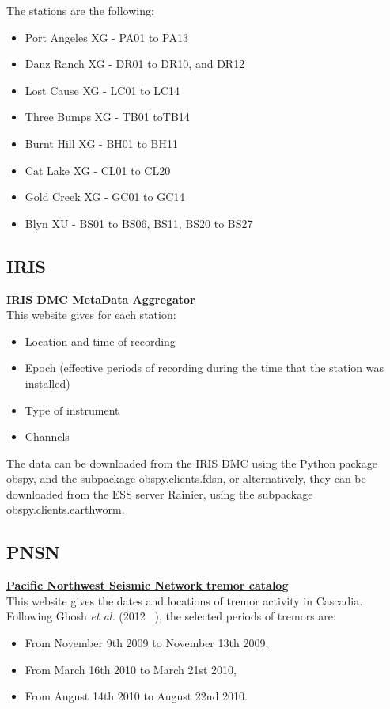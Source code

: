 \documentclass[main.tex]{subfiles}
\begin{document}
The stations are the following:
\begin{itemize}
	\item Port Angeles XG - PA01 to PA13
	\item Danz Ranch XG - DR01 to DR10, and DR12
	\item Lost Cause XG - LC01 to LC14
	\item Three Bumps XG - TB01 toTB14
	\item Burnt Hill XG - BH01 to BH11
	\item Cat Lake XG - CL01 to CL20
	\item Gold Creek XG - GC01 to GC14
	\item Blyn XU - BS01 to BS06, BS11, BS20 to BS27
\end{itemize}

\subsection{IRIS}

\href{http://ds.iris.edu/mda}{\textbf{IRIS DMC MetaData Aggregator}} \\

This website gives for each station:
\begin{itemize}
	\item Location and time of recording
	\item Epoch (effective periods of recording during the time that the station was installed)
	\item Type of instrument
	\item Channels
\end{itemize}

The data can be downloaded from the IRIS DMC using the Python package obspy, and the subpackage obspy.clients.fdsn, or alternatively, they can be downloaded from the ESS server Rainier, using the subpackage obspy.clients.earthworm.

\subsection{PNSN}

\href{https://www.pnsn.org/tremor}{\textbf{Pacific Northwest Seismic Network tremor catalog}} \\

This website gives the dates and locations of tremor activity in Cascadia. Following Ghosh \textit{et al.} (2012 ~\cite{GHO_2012}), the selected periods of tremors are:
\begin{itemize}
	\item From November 9th 2009 to November 13th 2009,
	\item From March 16th 2010 to March 21st 2010,
	\item From August 14th 2010 to August 22nd 2010.
\end{itemize}
\end{document}
